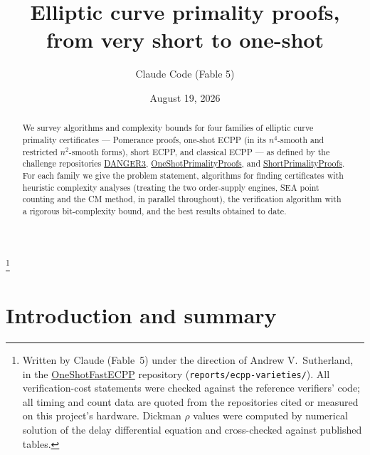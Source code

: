 \documentclass[11pt]{amsart}
\theoremstyle{plain}
\theoremstyle{definition}
\theoremstyle{remark}
\begin{document}
\title[Elliptic curve primality proofs]{Elliptic curve primality proofs,\\ from very short to one-shot}
\author{Claude Code (Fable 5)}
\thanks{Written by Claude (Fable~5) under the direction of Andrew V.\ Sutherland, in the
\href{https://github.com/AndrewVSutherland2/OneShotFastECPP}{OneShotFastECPP} repository
(\texttt{reports/ecpp-varieties/}).  All verification-cost statements were checked against the reference
verifiers' code; all timing and count data are quoted from the repositories cited or measured on this
project's hardware.  Dickman $\rho$ values were computed by numerical solution of the delay differential
equation and cross-checked against published tables.}
\date{August 19, 2026}

\begin{abstract}
We survey algorithms and complexity bounds for four families of elliptic curve primality certificates ---
Pomerance proofs, one-shot ECPP (in its $n^4$-smooth and restricted $n^2$-smooth forms), short ECPP, and
classical ECPP --- as defined by the challenge repositories
\href{https://github.com/AndrewVSutherland/DANGER3}{DANGER3},
\href{https://github.com/AndrewVSutherland/OneShotPrimalityProofs}{OneShotPrimalityProofs}, and
\href{https://github.com/AndrewVSutherland/ShortPrimalityProofs}{ShortPrimalityProofs}.
For each family we give the problem statement, algorithms for finding certificates with heuristic
complexity analyses (treating the two order-supply engines, SEA point counting and the CM method, in
parallel throughout), the verification algorithm with a rigorous bit-complexity bound, and the best
results obtained to date.
\end{abstract}

\maketitle

\setcounter{tocdepth}{2}
\tableofcontents

\section{Introduction and summary}\label{sec:intro}
\end{document}
